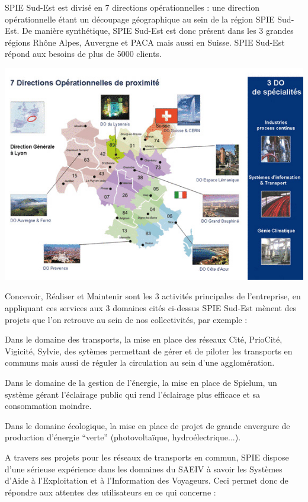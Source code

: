 SPIE Sud-Est est divisé en 7 directions opérationnelles : une direction opérationnelle étant un découpage géographique au sein de la région SPIE Sud-Est. De manière synthétique, SPIE Sud-Est est donc présent dans les 3 grandes régions Rhône Alpes, Auvergne et PACA mais aussi en Suisse. SPIE Sud-Est répond aux besoins de plus de 5000 clients.

\begin {center}
\includegraphics[width=\textwidth]{png_generaux/TerritoireSPIE.jpg}
\end {center}

Concevoir, Réaliser et Maintenir sont les 3 activités principales de l’entreprise, en appliquant ces services aux 3 domaines cités ci-dessus SPIE Sud-Est mènent des projets que l’on retrouve au sein de nos collectivités, par exemple :

Dans le domaine des transports, la mise en place des réseaux Cité, PrioCité, Vigicité, Sylvie, des sytèmes permettant de gérer et de piloter les transports en communs mais aussi de réguler la circulation au sein d’une agglomération.

Dans le domaine de la gestion de l’énergie, la mise en place de Spielum, un système gérant l’éclairage public qui rend l’éclairage plus efficace et sa consommation moindre.

Dans le domaine écologique, la mise en place de projet de grande envergure de production d’énergie “verte” (photovoltaïque, hydroélectrique...).

A travers ses projets pour les réseaux de transports en commun, SPIE dispose d’une sérieuse expérience dans les domaines du SAEIV à savoir les Systèmes d’Aide à l’Exploitation et à l’Information des Voyageurs. Ceci permet donc de répondre aux attentes des utilisateurs en ce qui concerne :

